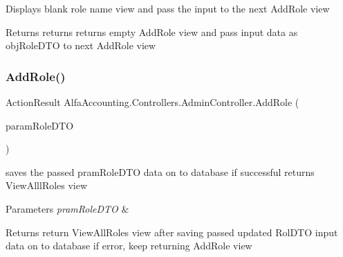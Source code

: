 Displays blank role name view and pass the input to the next Add\+Role view 

\begin{DoxyReturn}{Returns}
returns returns empty Add\+Role view and pass input data as obj\+Role\+D\+TO to next Add\+Role view
\end{DoxyReturn}
\mbox{\label{class_alfa_accounting_1_1_controllers_1_1_admin_controller_a3d687320b749a1965076591cac812ef4}} 
\subsubsection{\texorpdfstring{Add\+Role()}{AddRole()}\hspace{0.1cm}{\footnotesize\ttfamily [2/2]}}
{\footnotesize\ttfamily Action\+Result Alfa\+Accounting.\+Controllers.\+Admin\+Controller.\+Add\+Role (\begin{DoxyParamCaption}\item[{Role\+D\+TO}]{param\+Role\+D\+TO }\end{DoxyParamCaption})}



saves the passed pram\+Role\+D\+TO data on to database if successful returns View\+Alll\+Roles view 


\begin{DoxyParams}{Parameters}
{\em pram\+Role\+D\+TO} & \\
\hline
\end{DoxyParams}
\begin{DoxyReturn}{Returns}
return View\+All\+Roles view after saving passed updated Rol\+D\+TO input data on to database if error, keep returning Add\+Role view 
\end{DoxyReturn}
\mbox{\label{class_alfa_accounting_1_1_controllers_1_1_admin_controller_a47eec1c8309957dd23123d70b40cb9a8}} 
